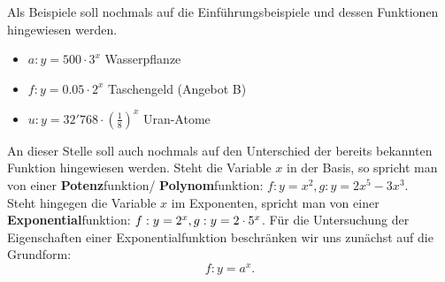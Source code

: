 \documentclass[11pt,oneside]{article}
\begin{document}
	\begin{beispiel}
		Als Beispiele soll nochmals auf die Einführungsbeispiele und dessen Funktionen hingewiesen werden.
		\begin{itemize}
			\item $\displaystyle a:y=500\cdot 3^x$ \glqq Wasserpflanze\grqq
			\item $\displaystyle f:y=0.05\cdot 2^x$ \glqq Taschengeld (Angebot B)\grqq
			\item $\displaystyle u:y=32'768\cdot \left(\frac{1}{8}\right)^x$ \glqq Uran-Atome\grqq
		\end{itemize}
	\end{beispiel}
	An dieser Stelle soll auch nochmals auf den Unterschied der bereits bekannten Funktion hingewiesen werden.\newline
	Steht die Variable $x$ in der Basis, so spricht man von einer \textbf{Potenz}funktion/ \textbf{Polynom}funktion: $f:y=x^2, g:y=2x^5-3x^3$.\\
	Steht hingegen die Variable $x$ im Exponenten, spricht man von einer \textbf{Exponential}funktion: ${f:y=2^x},\\ {g:y=2\cdot 5^x}$.\newpage
	Für die Untersuchung der Eigenschaften einer Exponentialfunktion beschränken wir uns zunächst auf die Grundform: \[f:y=a^x.\]
\end{document}
